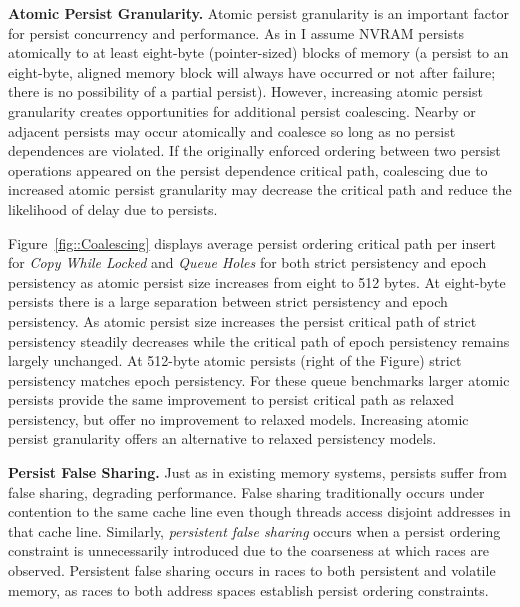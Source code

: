 \textbf{Atomic Persist Granularity.}
Atomic persist granularity is an important factor for persist concurrency and performance.
As in \cite{ConditNightingale09} I assume NVRAM persists atomically to at least eight-byte (pointer-sized) blocks of memory (a persist to an eight-byte, aligned memory block will always have occurred or not after failure; there is no possibility of a partial persist).
However, increasing atomic persist granularity creates opportunities for additional persist coalescing.
Nearby or adjacent persists may occur atomically and coalesce so long as no persist dependences are violated.
If the originally enforced ordering between two persist operations appeared on the persist dependence critical path, coalescing due to increased atomic persist granularity may decrease the critical path and reduce the likelihood of delay due to persists.

 

Figure~\ref{fig::Coalescing} displays average persist ordering critical path per insert for \emph{Copy While Locked} and \emph{Queue Holes} for both strict persistency and epoch persistency as atomic persist size increases from eight to 512 bytes.
At eight-byte persists there is a large separation between strict persistency and epoch persistency.
As atomic persist size increases the persist critical path of strict persistency steadily decreases while the critical path of epoch persistency remains largely unchanged.
At 512-byte atomic persists (right of the Figure) strict persistency matches epoch persistency.
For these queue benchmarks larger atomic persists provide the same improvement to persist critical path as relaxed persistency, but offer no improvement to relaxed models.
Increasing atomic persist granularity offers an alternative to relaxed persistency models.

\textbf{Persist False Sharing.}
Just as in existing memory systems, persists suffer from false sharing, degrading performance.
False sharing traditionally occurs under contention to the same cache line even though threads access disjoint addresses in that cache line.
Similarly, \emph{persistent false sharing} occurs when a persist ordering constraint is unnecessarily introduced due to the coarseness at which races are observed.
Persistent false sharing occurs in races to both persistent and volatile memory, as races to both address spaces establish persist ordering constraints.

